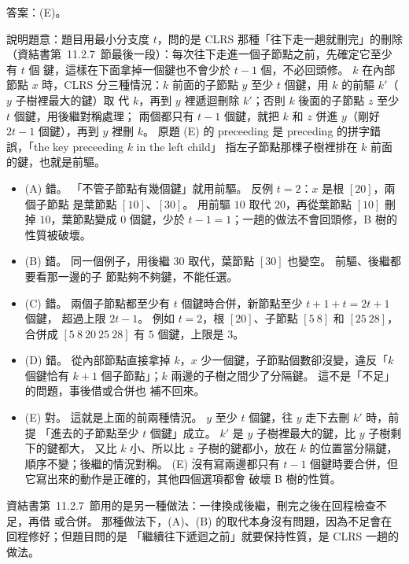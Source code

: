 \begin{pastsoln}
答案：(E)。

說明題意：題目用最小分支度 $t$，問的是 CLRS 那種「往下走一趟就刪完」的刪除
（資結書第~11.2.7~節最後一段）：每次往下走進一個子節點之前，先確定它至少有 $t$ 個
鍵，這樣在下面拿掉一個鍵也不會少於 $t - 1$ 個，不必回頭修。 $k$ 在內部節點 $x$ 時，CLRS
分三種情況：$k$ 前面的子節點 $y$ 至少 $t$ 個鍵，用 $k$ 的前驅 $k'$（$y$ 子樹裡最大的鍵）取
代 $k$，再到 $y$ 裡遞迴刪除 $k'$；否則 $k$ 後面的子節點 $z$ 至少 $t$ 個鍵，用後繼對稱處理；
兩個都只有 $t - 1$ 個鍵，就把 $k$ 和 $z$ 併進 $y$（剛好 $2t - 1$ 個鍵），再到 $y$ 裡刪 $k$。
原題 (E) 的 preceeding 是 preceding 的拼字錯誤，「the key preceeding $k$ in the left child」
指左子節點那棵子樹裡排在 $k$ 前面的鍵，也就是前驅。

\begin{itemize}
\item (A) 錯。 「不管子節點有幾個鍵」就用前驅。 反例 $t = 2$：$x$ 是根 $[20]$，兩個子節點
是葉節點 $[10]$、$[30]$。 用前驅 $10$ 取代 $20$，再從葉節點 $[10]$ 刪掉 $10$，葉節點變成
$0$ 個鍵，少於 $t - 1 = 1$；一趟的做法不會回頭修，B 樹的性質被破壞。
\item (B) 錯。 同一個例子，用後繼 $30$ 取代，葉節點 $[30]$ 也變空。 前驅、後繼都要看那一邊的子
節點夠不夠鍵，不能任選。
\item (C) 錯。 兩個子節點都至少有 $t$ 個鍵時合併，新節點至少 $t + 1 + t = 2t + 1$ 個鍵，
超過上限 $2t - 1$。 例如 $t = 2$，根 $[20]$、子節點 $[5\ 8]$ 和 $[25\ 28]$，合併成
$[5\ 8\ 20\ 25\ 28]$ 有 $5$ 個鍵，上限是 $3$。
\item (D) 錯。 從內部節點直接拿掉 $k$，$x$ 少一個鍵，子節點個數卻沒變，違反「$k$ 個鍵恰有
$k + 1$ 個子節點」；$k$ 兩邊的子樹之間少了分隔鍵。 這不是「不足」的問題，事後借或合併也
補不回來。
\item (E) 對。 這就是上面的前兩種情況。 $y$ 至少 $t$ 個鍵，往 $y$ 走下去刪 $k'$ 時，前提
「進去的子節點至少 $t$ 個鍵」成立。 $k'$ 是 $y$ 子樹裡最大的鍵，比 $y$ 子樹剩下的鍵都大，
又比 $k$ 小、所以比 $z$ 子樹的鍵都小，放在 $k$ 的位置當分隔鍵，順序不變；後繼的情況對稱。
(E) 沒有寫兩邊都只有 $t - 1$ 個鍵時要合併，但它寫出來的動作是正確的，其他四個選項都會
破壞 B 樹的性質。
\end{itemize}
資結書第~11.2.7~節用的是另一種做法：一律換成後繼，刪完之後在回程檢查不足，再借
或合併。 那種做法下，(A)、(B) 的取代本身沒有問題，因為不足會在回程修好；但題目問的是
「繼續往下遞迴之前」就要保持性質，是 CLRS 一趟的做法。
\end{pastsoln}
